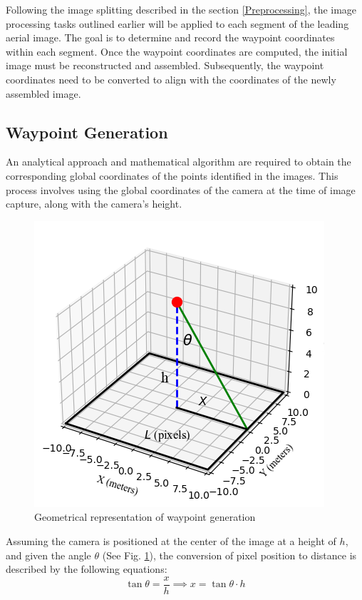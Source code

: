 \documentclass[conference]{IEEEtran}
\begin{document}
	Following the image splitting described in the section
	\ref{Preprocessing}, the image processing tasks outlined earlier will be applied to each segment of the leading aerial image. The goal is to determine and record the waypoint coordinates within each segment. Once the waypoint coordinates are computed, the initial image must be reconstructed and assembled. Subsequently, the waypoint coordinates need to be converted to align with the coordinates of the newly assembled image.
	
	\subsection{Waypoint Generation}\label{Waypoint Generation}
	An analytical approach and mathematical algorithm are required to obtain the corresponding global coordinates of the points identified in the images. This process involves using the global coordinates of the camera at the time of image capture, along with the camera's height.
	
	\begin{figure}[t]
		\centering
		\includegraphics[width=0.6\linewidth]{waypoint_geometry}
		\caption{Geometrical representation of waypoint generation}
		\label{fig:waypointgeometry}
	\end{figure}
	
	Assuming the camera is positioned at the center of the image at a height of \( h \), and given the angle \( \theta \) (See Fig. \ref{fig:waypointgeometry}), the conversion of pixel position to distance is described by the following equations:
	\begin{equation}
		\tan \theta = \frac{x}{h} \implies x = \tan \theta  \cdot h
		\label{eq:1}
	\end{equation}
	
\end{document}
